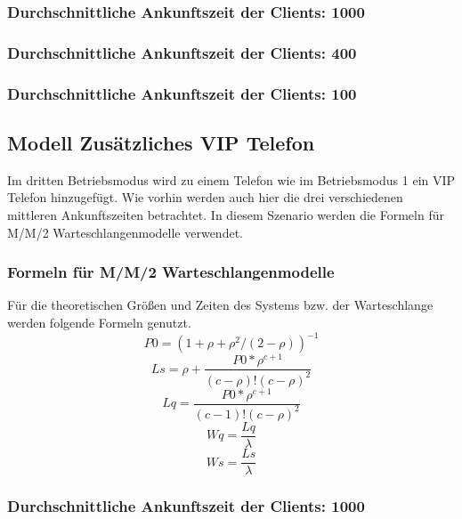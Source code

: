 \subsubsection{Durchschnittliche Ankunftszeit der Clients: 1000}
\subsubsection{Durchschnittliche Ankunftszeit der Clients: 400}
\subsubsection{Durchschnittliche Ankunftszeit der Clients: 100}

\subsection{Modell \glqq Zusätzliches VIP Telefon\grqq} 
Im dritten Betriebsmodus wird zu einem Telefon wie im Betriebsmodus 1 ein VIP Telefon hinzugefügt. Wie vorhin werden auch hier die drei verschiedenen mittleren Ankunftszeiten betrachtet. In diesem Szenario werden die Formeln für M/M/2 Warteschlangenmodelle verwendet. 
\subsubsection{Formeln für M/M/2 Warteschlangenmodelle}
\label{Formeln2}
Für die theoretischen Größen und Zeiten des Systems bzw. der Warteschlange werden folgende Formeln genutzt.
\begin{equation}
P0=(1+\rho+\rho^2/(2-\rho))^{-1}
\end{equation}
\begin{equation}
Ls=\rho + \frac{P0*\rho^{c+1}}{(c-\rho)!(c-\rho)^2}
\end{equation}
\begin{equation}
Lq=\frac{P0*\rho^{c+1}}{(c-1)!(c-\rho)^2}
\end{equation}
\begin{equation}
Wq=\frac{Lq}{\lambda}
\end{equation}
\begin{equation}
Ws=\frac{Ls}{\lambda}
\end{equation}
\subsubsection{Durchschnittliche Ankunftszeit der Clients: 1000}
